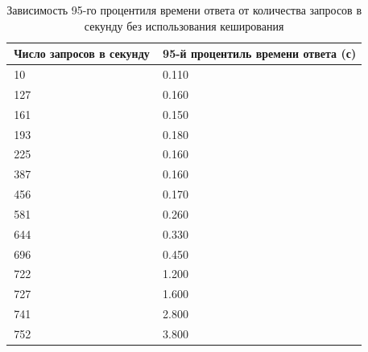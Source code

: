 \begin{table}[H]
\centering
\caption{Зависимость 95-го процентиля времени ответа от количества запросов в секунду без использования кеширования}
\begin{tabular}{|m{6.85cm}|m{9.25cm}|}
\hline
    \,\hfill \textbf{Число запросов в секунду} & \,\hfill \textbf{95-й процентиль времени ответа (с)} \\ \hline
    \,\hfill  10 \hfill\, & \,\hfill 0.110 \hfill\, \\ \hline
    \,\hfill 127 \hfill\, & \,\hfill 0.160 \hfill\, \\ \hline
    \,\hfill 161 \hfill\, & \,\hfill 0.150 \hfill\, \\ \hline
    \,\hfill 193 \hfill\, & \,\hfill 0.180 \hfill\, \\ \hline
    \,\hfill 225 \hfill\, & \,\hfill 0.160 \hfill\, \\ \hline
    \,\hfill 387 \hfill\, & \,\hfill 0.160 \hfill\, \\ \hline
    \,\hfill 456 \hfill\, & \,\hfill 0.170 \hfill\, \\ \hline
    \,\hfill 581 \hfill\, & \,\hfill 0.260 \hfill\, \\ \hline
    \,\hfill 644 \hfill\, & \,\hfill 0.330 \hfill\, \\ \hline
    \,\hfill 696 \hfill\, & \,\hfill 0.450 \hfill\, \\ \hline
    \,\hfill 722 \hfill\, & \,\hfill 1.200 \hfill\, \\ \hline
    \,\hfill 727 \hfill\, & \,\hfill 1.600 \hfill\, \\ \hline
    \,\hfill 741 \hfill\, & \,\hfill 2.800 \hfill\, \\ \hline
    \,\hfill 752 \hfill\, & \,\hfill 3.800 \hfill\, \\ \hline
\end{tabular}
\label{tab:nocache:95}
\end{table}


